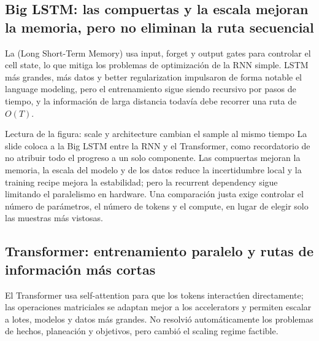 \subsection{Big LSTM: las compuertas y la escala mejoran la memoria, pero no eliminan la ruta secuencial}

La  (Long Short-Term Memory) usa input, forget y output gates para controlar el cell state, lo que mitiga los problemas de optimización de la RNN simple. LSTM más grandes, más datos y better regularization impulsaron de forma notable el language modeling, pero el entrenamiento sigue siendo recursivo por pasos de tiempo, y la información de larga distancia todavía debe recorrer una ruta de $O(T)$.


\begin{knowledgebox}{Lectura de la figura: scale y architecture cambian el sample al mismo tiempo}
La slide coloca a la Big LSTM entre la RNN y el Transformer, como recordatorio de no atribuir todo el progreso a un solo componente. Las compuertas mejoran la memoria, la escala del modelo y de los datos reduce la incertidumbre local y la training recipe mejora la estabilidad; pero la recurrent dependency sigue limitando el paralelismo en hardware. Una comparación justa exige controlar el número de parámetros, el número de tokens y el compute, en lugar de elegir solo las muestras más vistosas.
\end{knowledgebox}

\subsection{Transformer: entrenamiento paralelo y rutas de información más cortas}

El Transformer usa self-attention para que los tokens interactúen directamente; las operaciones matriciales se adaptan mejor a los accelerators y permiten escalar a lotes, modelos y datos más grandes. No resolvió automáticamente los problemas de hechos, planeación y objetivos, pero cambió el scaling regime factible.


